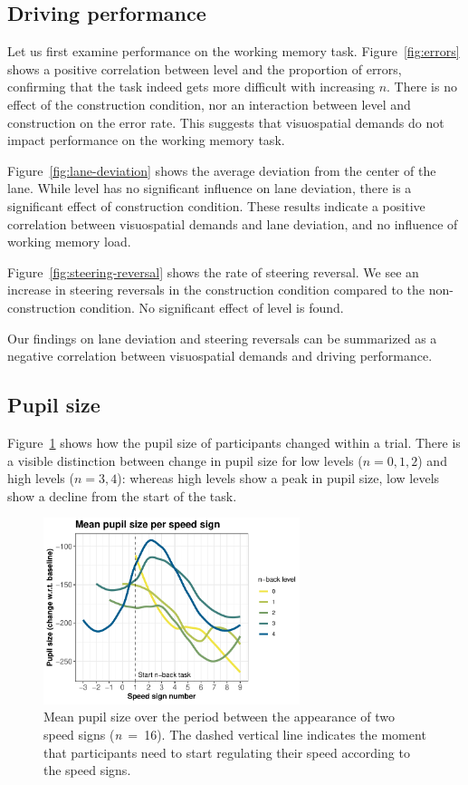 \subsection{Driving performance}
Let us first examine performance on the working memory task.
Figure~\ref{fig:errors} shows a positive correlation between \nback level and the proportion of errors,
confirming that the \nback task indeed gets more difficult with increasing \(n\). 
There is no effect of the construction condition, nor an interaction between \nback level and construction on the error rate.
This suggests that visuospatial demands do not impact performance on the working memory task.

Figure~\ref{fig:lane-deviation} shows the average deviation from the center of the lane.
While \nback level has no significant influence on lane deviation, there is a significant effect of construction condition.
These results indicate a positive correlation between visuospatial demands and lane deviation, and no influence of working memory load.

Figure~\ref{fig:steering-reversal} shows the rate of steering reversal.
We see an increase in steering reversals in the construction condition compared to the non-construction condition.
No significant effect of \nback level is found.

Our findings on lane deviation and steering reversals can be summarized as a negative correlation between visuospatial demands and driving performance.

\subsection{Pupil size}
Figure~\ref{fig:ps-speed-sign} shows how the pupil size of participants changed within a trial.
There is a visible distinction between change in pupil size for low \nback levels (\(n = 0,1,2\)) and high \nback levels (\(n = 3,4\)):
whereas high \nback levels show a peak in pupil size, low \nback levels show a decline from the start of the task.

\begin{figure}
  \centering
  \includegraphics[width=7.5cm]{images/speed_sign_nback.pdf}
  \caption{Mean pupil size over the period between the appearance of two speed signs (\textit{n}\ =\ 16).
  The dashed vertical line indicates the moment that participants need to start regulating their speed according to the speed signs.}
  \label{fig:ps-speed-sign}
\end{figure}

